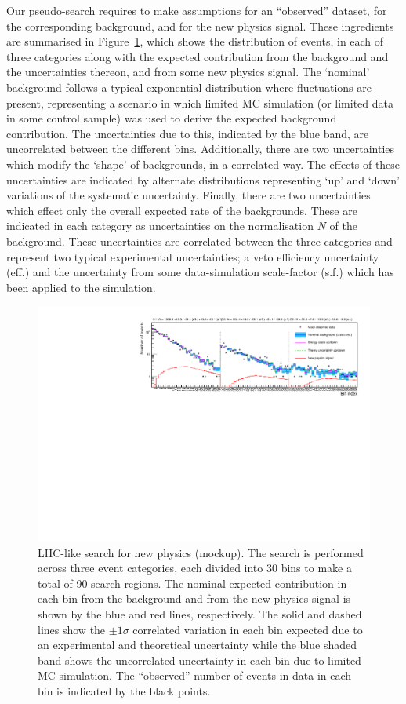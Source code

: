 \documentclass[11pt]{article}
\begin{document}
Our pseudo-search requires to make  assumptions for an ``observed'' dataset, for the corresponding background, and for the new physics signal.  These ingredients are summarised in Figure~\ref{fig:toy},   
which shows the distribution of events, in each of three categories along with the expected contribution from the background 
and the uncertainties thereon, 
and from some new physics signal.
The `nominal' background follows a typical exponential distribution where fluctuations are present, representing a scenario in which limited MC  simulation (or limited data in some control sample) was used
to derive the expected background contribution. The uncertainties due to this, indicated by the blue band, are uncorrelated between the different bins. Additionally, there are two uncertainties which modify the `shape' of
backgrounds, in a correlated way. The effects of these uncertainties are indicated by alternate distributions representing `up' and `down' variations of the systematic uncertainty. Finally, there are two uncertainties
which effect only the overall expected rate of the backgrounds. These are indicated in each category as uncertainties on the normalisation $N$ of the background. These uncertainties are correlated between the three categories
and represent two typical experimental uncertainties; a veto efficiency uncertainty (eff.) and the uncertainty from some data-simulation scale-factor (s.f.) which has been applied to the simulation.

\begin{figure}
\begin{center}
\includegraphics[width=\textwidth]{figures/t}
\end{center}
\caption{LHC-like search for new physics (mockup). The search is performed across three event categories, each divided into 30 bins to make a total of 90 search regions. The nominal expected contribution in each bin from the
background and from the new physics signal is shown by the blue and red lines, respectively. The solid and dashed lines show the $\pm1\sigma$ correlated variation in each bin expected due to an experimental and theoretical
uncertainty while the blue shaded band shows the uncorrelated uncertainty in each bin due to limited MC simulation. The ``observed'' number of events in data in each bin is indicated by the black points.}
\label{fig:toy}
\end{figure}
\end{document}
